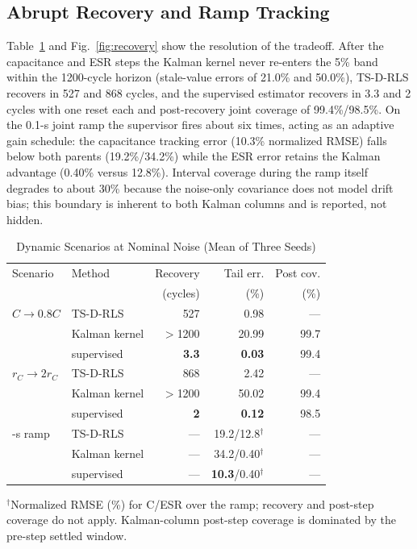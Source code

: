 \documentclass[journal]{IEEEtran}
\newcommand{\TSRLS}{TS-D-RLS}
\begin{document}
\subsection{Abrupt Recovery and Ramp Tracking}
Table~\ref{tab:dynamic} and Fig.~\ref{fig:recovery} show the resolution
of the tradeoff. After the capacitance and ESR steps the Kalman kernel
never re-enters the 5\% band within the 1200-cycle horizon (stale-value
errors of 21.0\% and 50.0\%), \TSRLS{} recovers in 527 and 868 cycles,
and the supervised estimator recovers in 3.3 and 2 cycles with one reset
each and post-recovery joint coverage of 99.4\%/98.5\%. On the 0.1-s
joint ramp the supervisor fires about six times, acting as an adaptive
gain schedule: the capacitance tracking error (10.3\% normalized RMSE)
falls below both parents (19.2\%/34.2\%) while the ESR error retains the
Kalman advantage (0.40\% versus 12.8\%). Interval coverage during the
ramp itself degrades to about 30\% because the noise-only covariance
does not model drift bias; this boundary is inherent to both Kalman
columns and is reported, not hidden.

\begin{table}[t]
\caption{Dynamic Scenarios at Nominal Noise (Mean of Three Seeds)}
\label{tab:dynamic}
\centering
\footnotesize
\setlength{\tabcolsep}{3.2pt}
\begin{tabular}{llrrr}
\toprule
Scenario & Method & Recovery & Tail err. & Post cov. \\
 & & (cycles) & (\%) & (\%) \\
\midrule
$C\!\rightarrow\!0.8C$ & \TSRLS{} & 527 & 0.98 & --- \\
 & Kalman kernel & $>$1200 & 20.99 & 99.7 \\
 & supervised & \textbf{3.3} & \textbf{0.03} & 99.4 \\
\addlinespace[2pt]
$r_C\!\rightarrow\!2r_C$ & \TSRLS{} & 868 & 2.42 & --- \\
 & Kalman kernel & $>$1200 & 50.02 & 99.4 \\
 & supervised & \textbf{2} & \textbf{0.12} & 98.5 \\
\addlinespace[2pt]
0.1-s ramp & \TSRLS{} & --- & 19.2/12.8$^{\dagger}$ & --- \\
 & Kalman kernel & --- & 34.2/0.40$^{\dagger}$ & --- \\
 & supervised & --- & \textbf{10.3}/0.40$^{\dagger}$ & --- \\
\bottomrule
\end{tabular}
\vspace{1mm}

\begin{minipage}{\columnwidth}
\scriptsize $^{\dagger}$Normalized RMSE (\%) for C/ESR over the ramp;
recovery and post-step coverage do not apply. Kalman-column post-step
coverage is dominated by the pre-step settled window.
\end{minipage}
\end{table}
\end{document}
